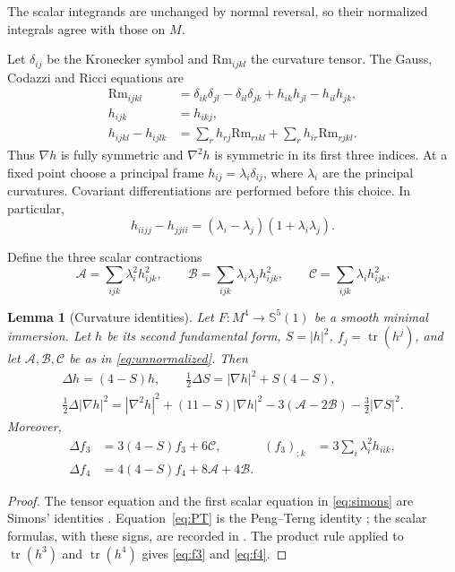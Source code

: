 \documentclass[11pt,a4paper]{amsart}
\numberwithin{equation}{section}
\newtheorem{lemma}[theorem]{Lemma}
\theoremstyle{definition}
\theoremstyle{remark}
\DeclareMathOperator{\tr}{tr}
\newcommand{\Sph}{\mathbb S}
\begin{document}
The scalar integrands are unchanged by normal
reversal, so their normalized integrals agree with those on $M$.

Let $\delta_{ij}$ be the Kronecker symbol and $\mathrm{Rm}_{ijkl}$
the curvature tensor. The Gauss, Codazzi and Ricci equations are
\begin{align}
 \mathrm{Rm}_{ijkl}&=\delta_{ik}\delta_{jl}-\delta_{il}\delta_{jk}
              +h_{ik}h_{jl}-h_{il}h_{jk},\label{eq:gauss}\\
 h_{ijk}&=h_{ikj},\label{eq:codazzi}\\
 h_{ijkl}-h_{ijlk}
 &=\sum_r h_{rj}\mathrm{Rm}_{rikl}+\sum_r h_{ir}\mathrm{Rm}_{rjkl}.\label{eq:ricci}
\end{align}
Thus $\nabla h$ is fully symmetric and $\nabla^2h$ is symmetric in its
first three indices. At a fixed point choose a principal frame
$h_{ij}=\lambda_i\delta_{ij}$, where $\lambda_i$ are the principal
curvatures. Covariant differentiations are performed
before this choice. In particular,
\begin{equation}\label{eq:riccipair}
 h_{iijj}-h_{jjii}=(\lambda_i-\lambda_j)(1+\lambda_i\lambda_j).
\end{equation}

Define the three scalar contractions
\begin{equation}\label{eq:unnormalized}
 \mathcal A=\sum_{ijk}\lambda_i^2h_{ijk}^2,\qquad
 \mathcal B=\sum_{ijk}\lambda_i\lambda_jh_{ijk}^2,\qquad
 \mathcal C=\sum_{ijk}\lambda_i h_{ijk}^2.
\end{equation}
\begin{lemma}[Curvature identities]\label{lem:classical}
Let $F:M^4\to\Sph^5(1)$ be a smooth minimal immersion.
Let $h$ be its second fundamental form, $S=|h|^2$,
$f_j=\tr(h^j)$, and let $\mathcal A,\mathcal B,\mathcal C$ be
as in \eqref{eq:unnormalized}. Then
\begin{gather}
 \Delta h=(4-S)h,\qquad
 \tfrac12\Delta S=|\nabla h|^2+S(4-S),\label{eq:simons}\\
 \tfrac12\Delta|\nabla h|^2
 =|\nabla^2h|^2+(11-S)|\nabla h|^2
       -3(\mathcal A-2\mathcal B)-\tfrac32|\nabla S|^2.\label{eq:PT}
\end{gather}
Moreover,
\begin{align}
 \Delta f_3&=3(4-S)f_3+6\mathcal C,
 & (f_3)_{;k}&=3\sum_i\lambda_i^2h_{iik},\label{eq:f3}\\
 \Delta f_4&=4(4-S)f_4+8\mathcal A+4\mathcal B.\label{eq:f4}
\end{align}
\end{lemma}
\begin{proof}
The tensor equation and the first scalar equation in \eqref{eq:simons}
are Simons' identities \cite{Simons}. Equation~\eqref{eq:PT} is the
Peng--Terng identity \cite{PT1,PT2}; the scalar formulas, with these
signs, are recorded in \cite[Section~2, equations~(2.1)--(2.2)]{LXX}.
The product rule applied to $\tr(h^3)$ and $\tr(h^4)$ gives
\eqref{eq:f3} and \eqref{eq:f4}.
\end{proof}
\end{document}
